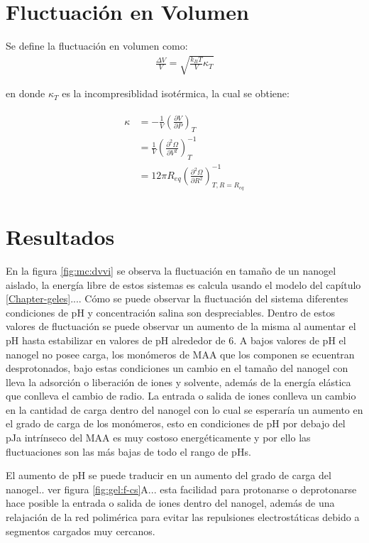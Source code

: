\section{Fluctuaci\'on en Volumen}
Se define la fluctuaci\'on en volumen como:
\begin{align}
	\frac{\Delta V}{V} = \sqrt{\frac{k_BT}{V}\kappa_T}
\end{align}

\noindent en donde $\kappa_T$ es la incompresiblidad isot\'ermica, la cual se obtiene:

\begin{align}
	\begin{aligned}
		\kappa & = -\frac{1}{V} \left( \frac{\partial V}{\partial P}\right)_T \\
		& =\frac{1}{V} \left( \frac{\partial^2 \Omega}{\partial V^2}\right)^{-1}_T \\
		& = 12 \pi R_{eq} \left( \frac{\partial^2 \Omega}{\partial R^2}\right)^{-1}_{T,R=R_{eq}}
	\end{aligned}
\end{align}


\section{Resultados}

En la figura \ref{fig:mc:dvvi} se observa la fluctuaci\'on en tama\~no de un nanogel aislado, la energ\'ia libre de estos sistemas es calcula usando el modelo del cap\'itulo \ref{Chapter-geles}....
C\'omo se puede observar la fluctuaci\'on del sistema diferentes condiciones de pH y concentraci\'on salina son despreciables.
Dentro de estos valores de fluctuaci\'on se puede observar un aumento de la misma al aumentar el pH hasta estabilizar en valores de pH alrededor de 6.
A bajos valores de pH el nanogel no posee carga, los mon\'omeros de MAA que los componen se ecuentran desprotonados, bajo estas condiciones un cambio en el tama\~no del nanogel con lleva la adsorci\'on o liberaci\'on de iones y solvente, adem\'as de la energ\'ia el\'astica que conlleva el cambio de radio.
La entrada o salida de iones conlleva un cambio en la cantidad de carga dentro del nanogel con lo cual se esperar\'ia un aumento en el grado de carga de los mon\'omeros, esto en condiciones de pH por debajo del pJa intr\'inseco del MAA es muy costoso energ\'eticamente y por ello las fluctuaciones son las m\'as bajas de todo el rango de pHs.

El aumento de pH se puede traducir en un aumento del grado de carga del nanogel.. ver figura \ref{fig:gel:f-cs}A... esta facilidad para protonarse o deprotonarse hace posible la entrada o salida de iones dentro del nanogel, adem\'as de una relajaci\'on de la red polim\'erica para evitar las repulsiones electrost\'aticas debido a segmentos cargados muy cercanos. 


